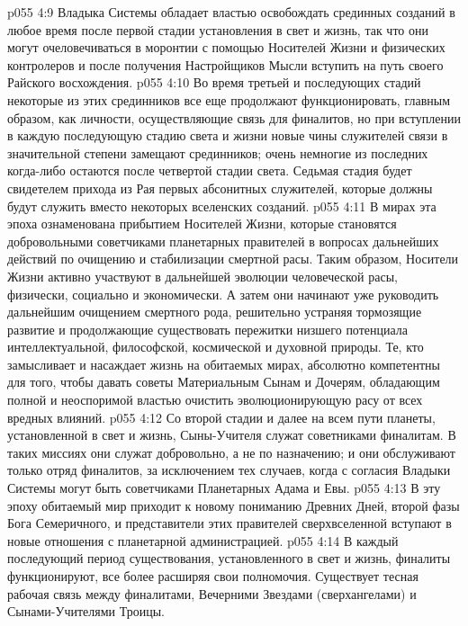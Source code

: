 \vs p055 4:9 Владыка Системы обладает властью освобождать срединных созданий в любое время после первой стадии установления в свет и жизнь, так что они могут очеловечиваться в моронтии с помощью Носителей Жизни и физических контролеров и после получения Настройщиков Мысли вступить на путь своего Райского восхождения.
\vs p055 4:10 Во время третьей и последующих стадий некоторые из этих срединников все еще продолжают функционировать, главным образом, как личности, осуществляющие связь для финалитов, но при вступлении в каждую последующую стадию света и жизни новые чины служителей связи в значительной степени замещают срединников; очень немногие из последних когда\hyp{}либо остаются после четвертой стадии света. Седьмая стадия будет свидетелем прихода из Рая первых абсонитных служителей, которые должны будут служить вместо некоторых вселенских созданий.
\vs p055 4:11 \pc {}\bibnobreakspace {} В мирах эта эпоха ознаменована прибытием Носителей Жизни, которые становятся добровольными советчиками планетарных правителей в вопросах дальнейших действий по очищению и стабилизации смертной расы. Таким образом, Носители Жизни активно участвуют в дальнейшей эволюции человеческой расы, физически, социально и экономически. А затем они начинают уже руководить дальнейшим очищением смертного рода, решительно устраняя тормозящие развитие и продолжающие существовать пережитки низшего потенциала интеллектуальной, философской, космической и духовной природы. Те, кто замысливает и насаждает жизнь на обитаемых мирах, абсолютно компетентны для того, чтобы давать советы Материальным Сынам и Дочерям, обладающим полной и неоспоримой властью очистить эволюционирующую расу от всех вредных влияний.
\vs p055 4:12 Со второй стадии и далее на всем пути планеты, установленной в свет и жизнь, Сыны\hyp{}Учителя служат советниками финалитам. В таких миссиях они служат добровольно, а не по назначению; и они обслуживают только отряд финалитов, за исключением тех случаев, когда с согласия Владыки Системы могут быть советчиками Планетарных Адама и Евы.
\vs p055 4:13 \pc {}\bibnobreakspace {} В эту эпоху обитаемый мир приходит к новому пониманию Древних Дней, второй фазы Бога Семеричного, и представители этих правителей сверхвселенной вступают в новые отношения с планетарной администрацией.
\vs p055 4:14 В каждый последующий период существования, установленного в свет и жизнь, финалиты функционируют, все более расширяя свои полномочия. Существует тесная рабочая связь между финалитами, Вечерними Звездами (сверхангелами) и Сынами\hyp{}Учителями Троицы.
